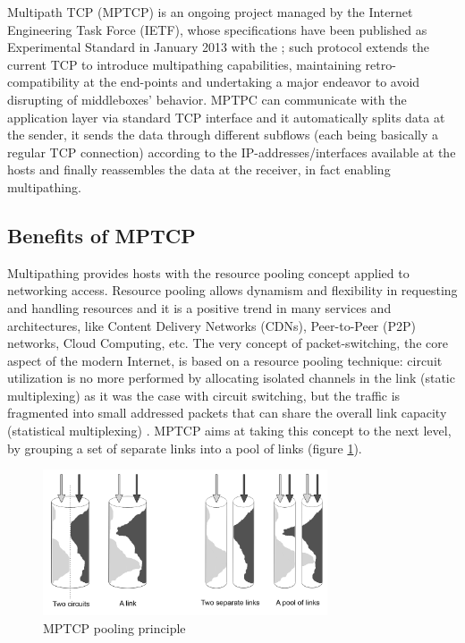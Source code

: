 Multipath TCP (MPTCP) is an ongoing project managed by the Internet Engineering Task Force (IETF), whose specifications have been published as Experimental Standard in January 2013 with the ; such protocol extends the current TCP to introduce multipathing capabilities, maintaining retro-compatibility at the end-points and undertaking a major endeavor to avoid disrupting of middleboxes' behavior. MPTPC can communicate with the application layer via standard TCP interface and it automatically splits data at the sender, it sends the data through different subflows (each being basically a regular TCP connection) according to the IP-addresses/interfaces available at the hosts and finally reassembles the data at the receiver, in fact enabling multipathing.

\subsection{Benefits of MPTCP}
\label{benefits}
Multipathing provides hosts with the resource pooling concept applied to networking access. Resource pooling allows dynamism and flexibility in requesting and handling resources and it is a positive trend in many services and architectures, like Content Delivery Networks (CDNs), Peer-to-Peer (P2P) networks, Cloud Computing, etc. The very concept of packet-switching, the core aspect of the modern Internet, is based on a resource pooling technique: circuit utilization is no more performed by allocating isolated channels in the link (static multiplexing) as it was the case with circuit switching, but the traffic is fragmented into small addressed packets that can share the overall link capacity (statistical multiplexing) \cite{DBLP:journals/corr/QadirAYSC15}. MPTCP aims at taking this concept to the next level, by grouping a set of separate links into a pool of links (figure \ref{fig:pooling}). 


\begin{figure}[!htb]
\centering
\includegraphics[width=0.75\textwidth]{images/pooling}
\caption{MPTCP pooling principle}
\label{fig:pooling}
\end{figure}


